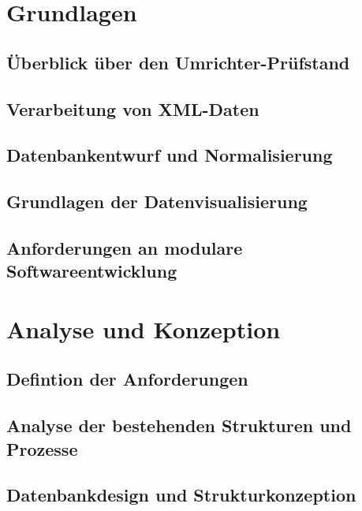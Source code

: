 \documentclass[
pagesize,				%
a4paper,				%
oneside,				%
headsepline,		    %
11pt,					%
halfparskip,		    %
final,					%
listof=totoc,		    %
]{scrartcl}			    %
\begin{document}

\newpage
\section{Grundlagen}
\label{Grundlagen}

\subsection{Überblick über den Umrichter-Prüfstand}

\subsection{Verarbeitung von XML-Daten}

\subsection{Datenbankentwurf und Normalisierung}

\subsection{Grundlagen der Datenvisualisierung}

\subsection{Anforderungen an modulare Softwareentwicklung}


\newpage
\section{Analyse und Konzeption}
\label{Analyse und Konzeption}

\subsection{Defintion der Anforderungen}

\subsection{Analyse der bestehenden Strukturen und Prozesse}

\subsection{Datenbankdesign und Strukturkonzeption}
\end{document}
